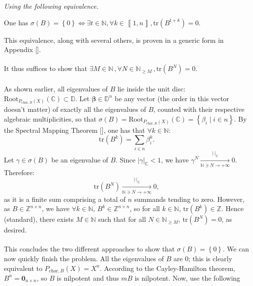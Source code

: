 \begin{solution}
    \textit{Using the following equivalence.}
    \begin{lemma}
        One has \( \sigma\left(B\right) = \left\{0\right\} \Leftrightarrow \exists t \in \mathbb{N}, \forall k \in \left\llbracket 1, n \right\rrbracket, \text{tr}\left(B^{t+k}\right) = 0 \).
    \end{lemma}
    This equivalence, along with several others, is proven in a generic form in Appendix [].
    \\\\
    It thus suffices to show that \( \exists M \in\mathbb{N}\,,\forall N\in\mathbb{N}_{\geq M}\,, \text{tr}\left(B^N\right)=0 \).
    \\\\
    As shown earlier, all eigenvalues of \( B \) lie inside the unit disc: \( \mathrm{Root}_{P_{\text{char},B}\left(X\right)}\left(\mathbb{C}\right) \subset \mathbb{D} \). Let \( \boldsymbol{\beta} \in \mathbb{D}^n \) be any vector (the order in this vector doesn't matter) of exactly all the eigenvalues of \( B \), counted with their respective algebraic multiplicities, so that \( \sigma\left(B\right) = \mathrm{Root}_{P_{\text{char},B}\left(X\right)}\left(\mathbb{C}\right) = \left\{ \beta_i \mid i \in n \right\} \). By the Spectral Mapping Theorem [], one has that \( \forall k\in\mathbb{N} \):
    \[
        \text{tr}\left(B^k\right)=\sum_{i\in n}\beta_i^k.
    \]
    Let \( \gamma \in \sigma\left(B\right) \) be an eigenvalue of \( B \). Since \( \left|\gamma\right|_{\mathbb{C}} < 1 \), we have \( \gamma^N \underset{\mathbb{N}\ni N \to +\infty}{\overset{\left|\cdot\right|_{\mathbb{C}}}{\longrightarrow}} 0 \). Therefore:
    \[
        \text{tr}\left(B^N\right) \underset{\mathbb{N}\ni N \to +\infty}{\overset{\left|\cdot\right|_{\mathbb{C}}}{\longrightarrow}} 0,
    \]
    as it is a finite sum comprising a total of \( n \) summands tending to zero. However, as \( B \in \mathbb{Z}^{n \times n} \), we have \( \forall k \in \mathbb{N}, \, B^k \in \mathbb{Z}^{n \times n} \), so for all \( k \in \mathbb{N} \), \( \text{tr}\left(B^k\right) \in \mathbb{Z} \). Hence (standard), there exists \( M\in\mathbb{N} \) such that for all \( N \in \mathbb{N}_{\geq M} \), \( \text{tr}\left(B^N\right) = 0 \), as desired.
    \\\\
    This concludes the two different approaches to show that \( \sigma\left( B \right) = \left\{ 0 \right\} \). We can now quickly finish the problem. All the eigenvalues of \( B \) are \( 0 \); this is clearly equivalent to \( P_{\text{char},B}\left( X \right) = X^n \). According to the Cayley-Hamilton theorem, \( B^n = \mathbf{0}_{n\times n} \), so \( B \) is nilpotent and thus \( mB \) is nilpotent. Now, use the following

\end{solution}
